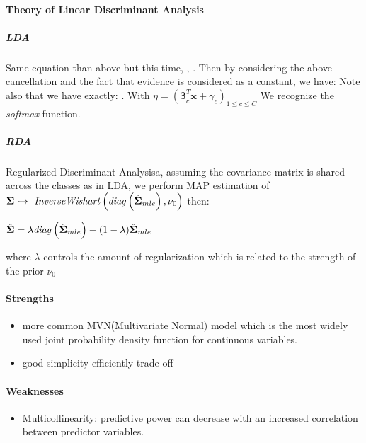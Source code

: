 \paragraph{Theory of Linear Discriminant Analysis}
\subparagraph{LDA}
Same equation than above but this time, , .
Then by considering the above cancellation and the fact that 
evidence is considered as a constant, we have:
Note also that we have exactly: . With $\eta=\left(
\bm{\beta}^{T}_{c}\bm{x} +\gamma_{c}\right)_{1\leq c\leq C}$
We recognize the \emph{softmax} function.
\subparagraph{RDA}
Regularized Discriminant Analysisa, assuming the covariance matrix is shared across the classes as in
LDA, we perform MAP estimation of $\bm{\Sigma}\hookrightarrow\text{ \emph{InverseWishart}}\left(
\text{\emph{diag}}\left(\hat{\bm{\Sigma}}_{mle}\right), \nu_{0}\right)$ then:
\begin{center}
    $\hat{\bm{\Sigma}} = \lambda\text{\emph{diag}}\left(\hat{\bm{\Sigma}}_{mle}\right) + (1-\lambda)
    \hat{\bm{\Sigma}}_{mle}$
\end{center}
where $\lambda$ controls the amount of regularization which is related to the strength of the prior
$\nu_{0}$


\paragraph{Strengths}
\begin{itemize}
    \item more common MVN(Multivariate Normal) model which is the most widely used joint probability
        density function for continuous variables.
    \item good simplicity-efficiently trade-off 
\end{itemize}

\paragraph{Weaknesses}
\begin{itemize}
    \item Multicollinearity: predictive power can decrease with an 
        increased correlation between predictor variables.
\end{itemize}

